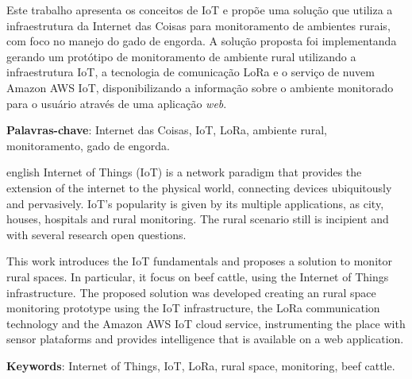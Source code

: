 \documentclass[
    hidelinks,
	12pt,				%
	openany,
	oneside, 
	a4paper,			%
	english,			%
	french,				%
	spanish,			%
	brazil				%
	]{abntex2}
\begin{document}
\begin{resumo}
Este trabalho apresenta os conceitos de IoT e propõe uma solução que utiliza a infraestrutura da Internet das Coisas para monitoramento de ambientes rurais, com foco no manejo do gado de engorda. A solução proposta foi implementanda gerando um protótipo de monitoramento de ambiente rural utilizando a infraestrutura IoT, a tecnologia de comunicação LoRa e o serviço de nuvem Amazon AWS IoT, disponibilizando a informação sobre o ambiente monitorado para o usuário através de uma aplicação \textit{web}.

\textbf{Palavras-chave}: Internet das Coisas, IoT, LoRa, ambiente rural, monitoramento, gado de engorda.
\end{resumo}

\begin{resumo}[Abstract]
\begin{otherlanguage*}{english}
Internet of Things (IoT) is a network paradigm that provides the extension of the internet to the physical world, connecting devices ubiquitously and pervasively. IoT's popularity is given by its multiple applications, as city, houses, hospitals and rural monitoring. The rural scenario still is incipient and with several research open questions. 

This work introduces the IoT fundamentals and proposes a solution to monitor rural spaces. In particular, it focus on beef cattle, using the Internet of Things infrastructure. The proposed solution was developed creating an rural space monitoring prototype using the IoT infrastructure, the LoRa communication technology and the Amazon AWS IoT cloud service, instrumenting the  place with sensor plataforms and provides intelligence that is available on a web application.

  \vspace{\onelineskip}

  \noindent 
  \textbf{Keywords}: Internet of Things, IoT, LoRa, rural space, monitoring, beef cattle.
\end{otherlanguage*}
\end{resumo}
%
% 
%
%  
\end{document}
